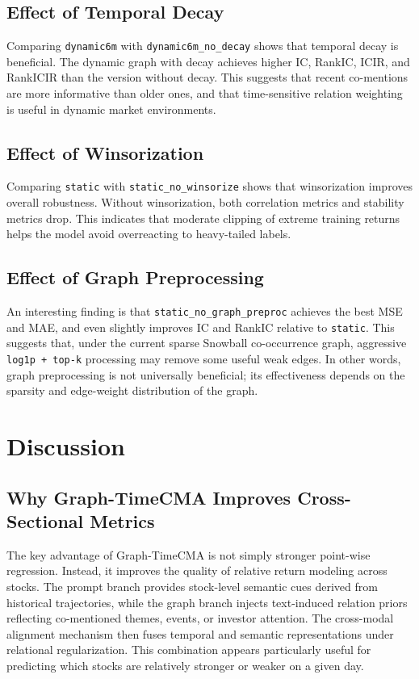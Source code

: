 \documentclass[11pt]{article}
\begin{document}
\subsection{Effect of Temporal Decay}

Comparing \texttt{dynamic6m} with \texttt{dynamic6m\_no\_decay} shows that temporal decay is beneficial. The dynamic graph with decay achieves higher IC, RankIC, ICIR, and RankICIR than the version without decay. This suggests that recent co-mentions are more informative than older ones, and that time-sensitive relation weighting is useful in dynamic market environments.

\subsection{Effect of Winsorization}

Comparing \texttt{static} with \texttt{static\_no\_winsorize} shows that winsorization improves overall robustness. Without winsorization, both correlation metrics and stability metrics drop. This indicates that moderate clipping of extreme training returns helps the model avoid overreacting to heavy-tailed labels.

\subsection{Effect of Graph Preprocessing}

An interesting finding is that \texttt{static\_no\_graph\_preproc} achieves the best MSE and MAE, and even slightly improves IC and RankIC relative to \texttt{static}. This suggests that, under the current sparse Snowball co-occurrence graph, aggressive \texttt{log1p + top-k} processing may remove some useful weak edges. In other words, graph preprocessing is not universally beneficial; its effectiveness depends on the sparsity and edge-weight distribution of the graph.

\section{Discussion}

\subsection{Why Graph-TimeCMA Improves Cross-Sectional Metrics}

The key advantage of Graph-TimeCMA is not simply stronger point-wise regression. Instead, it improves the quality of relative return modeling across stocks. The prompt branch provides stock-level semantic cues derived from historical trajectories, while the graph branch injects text-induced relation priors reflecting co-mentioned themes, events, or investor attention. The cross-modal alignment mechanism then fuses temporal and semantic representations under relational regularization. This combination appears particularly useful for predicting which stocks are relatively stronger or weaker on a given day.
\end{document}
